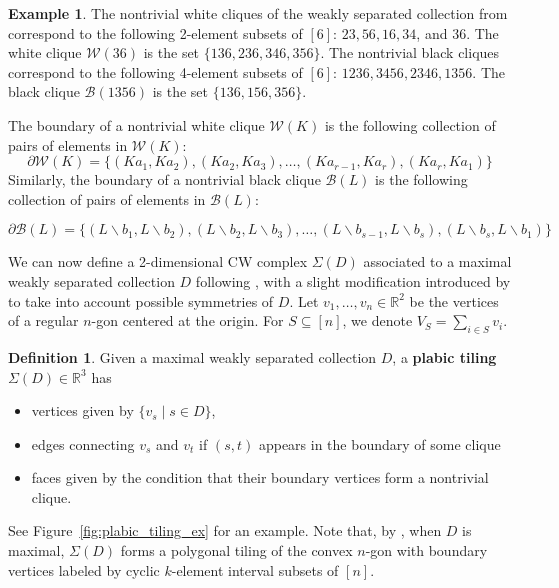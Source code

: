\documentclass[11pt]{amsart}
\newcommand{\R}{\mathbb{R}}
\theoremstyle{plain}
\theoremstyle{definition}
\newtheorem{definition}[theorem]{Definition}
\newtheorem{ex}[theorem]{Example}
\begin{document}
\begin{ex}
    The nontrivial white cliques of the weakly separated collection from  correspond to the following 2-element subsets of $[6]$: $23, 56, 16, 34$, and $36$. The white clique $\mathcal{W}(36)$ is the set $\{136, 236,346, 356\}$. The nontrivial black cliques correspond to the following 4-element subsets of $[6]$: $1236, 3456, 2346, 1356.$ The black clique $\mathcal{B}(1356)$ is the set $\{136, 156, 356\}$. 
\end{ex}

The boundary of a nontrivial white clique $\mathcal{W}(K)$ is the following collection of pairs of elements in $\mathcal{W}(K):$ 
\begin{equation*}
    \partial \mathcal{W}(K)=\{(Ka_1, Ka_2), (Ka_2, Ka_3),\dots, (Ka_{r-1}, Ka_r), (Ka_r, Ka_1)\}
\end{equation*}
Similarly, the boundary of a nontrivial black clique $\mathcal{B}(L)$ is the following collection of pairs of elements in $\mathcal{B}(L):$

\begin{equation*}
    \partial \mathcal{B}(L)=\{(L\backslash b_1, L\backslash b_2), (L\backslash b_2, L\backslash b_3),\dots, (L\backslash b_{s-1}, L\backslash b_s), (L\backslash b_s, L\backslash b_1)\}
\end{equation*}

We can now define a 2-dimensional CW complex $\Sigma(D)$ associated to a maximal weakly separated collection $D$ following \cite{OPS2015}, with a slight modification introduced by \cite{PasqTZ2019} to take into account possible symmetries of $D$. Let $v_1, \dots, v_n \in \R^2$ be the vertices of a regular $n$-gon centered at the origin. For $S\subseteq [n]$, we denote $V_S=\sum_{i\in S} v_i$.  
\begin{definition}\label{def:plabic-tiling}
Given a maximal weakly separated collection $D$, a \textbf{plabic tiling} $\Sigma(D) \in \mathbb{R}^3$ has 
\begin{itemize}
    \item vertices given by $\{v_s \mid s \in D\}$,
    \item edges connecting $v_s$ and $v_t$ if $(s, t)$ appears in the boundary of some clique
    \item faces given by the condition that their boundary vertices form a nontrivial clique.
\end{itemize}
\end{definition}

See Figure~\ref{fig:plabic_tiling_ex} for an example. Note that, by \cite[Proposition 9.4]{OPS2015}, when $D$ is maximal, $\Sigma(D)$ forms a polygonal tiling of the convex $n$-gon with boundary vertices labeled by cyclic $k$-element interval subsets of $[n]$.
\end{document}
